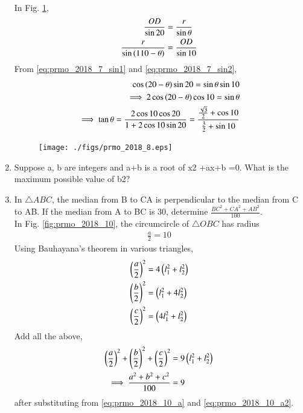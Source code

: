 \documentclass[journal,12pt,twocolumn]{IEEEtran}
\renewcommand\thesection{\arabic{section}}
\begin{document}
\begin{enumerate}[label=\thesection.\arabic*,ref=\thesection.\theenumi]
\\
\solution In Fig. \ref{fig:prmo_2018_8},
\begin{align}
\label{eq:prmo_2018_7_sin1}
\frac{OD}{\sin 20} &= \frac{r}{\sin \theta}
\\
\frac{r}{\sin \brak{110-\theta}} &= \frac{OD}{\sin 10}
\label{eq:prmo_2018_7_sin2}
\end{align}
%
From \eqref{eq:prmo_2018_7_sin1} and \eqref{eq:prmo_2018_7_sin2},
\begin{align}
\cos \left(20-\theta\right)\sin 20 = \sin \theta \sin 10 &
\\
\implies 2\cos \left(20-\theta\right)\cos 10 = \sin \theta &
\\
\implies \tan \theta = \frac{2\cos 10 \cos 20}{1 + 2\cos 10\sin 20} = \frac{\frac{\sqrt{3}}{2}+\cos 10 }{\frac{3}{2}+\sin 10}&
\end{align}
\begin{figure}[!ht]
\centering
\texttt{[image: ./figs/prmo\_2018\_8.eps]}
\caption{}
\label{fig:prmo_2018_8}
\end{figure}
\item Suppose a, b are integers and a+b is a root of x2 +ax+b =0. What is the maximum possible value of b2? 
\item In $\triangle ABC$, the median from B to CA is perpendicular to the median from C to AB. If the median from A to BC is 30, determine $\frac{BC^2 +CA^2 +AB^2}{100}$.
\\
\solution In Fig. \ref{fig:prmo_2018_10}, the circumcircle of $\triangle OBC$ has radius 
\begin{align}
\frac{a}{2} = 10
\label{eq:prmo_2018_10_a}
\end{align}
%
Using Bauhayana's theorem in various triangles, 
\begin{align}
\label{eq:prmo_2018_10_a2}
\brak{\frac{a}{2}}^2 &= 4 \brak{l_1^2+l_2^2} 
\\
\brak{\frac{b}{2}}^2 &=  \brak{l_1^2+4l_2^2} 
\\
\brak{\frac{c}{2}}^2 &=  \brak{4l_1^2+l_2^2} 
\end{align}
Add all the above, 
\begin{align}
\left(\frac{a}{2}\right)^2 + \left(\frac{b}{2}\right)^2 + \left(\frac{c}{2}\right)^2&= 9 \left(l_1^2+l_2^2\right) 
\\
\implies \frac{a^2+b^2+c^2}{100}&=9
\end{align}
after substituting from \eqref{eq:prmo_2018_10_a} and 
\eqref{eq:prmo_2018_10_a2}.


\end{enumerate}
\end{document}

